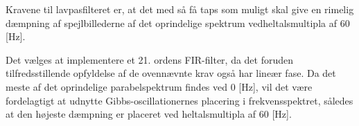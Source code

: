 Kravene til lavpasfilteret er, at det med så få taps
som muligt skal give en rimelig dæmpning af
spejlbillederne af det oprindelige spektrum vedheltalsmultipla af 60 [Hz].

Det vælges at implementere et 21. ordens FIR-filter, da det foruden tilfredsstillende opfyldelse
af de ovennævnte krav også har lineær fase.
Da det meste af det oprindelige parabelspektrum findes ved 0 [Hz], vil det være
fordelagtigt at udnytte Gibbs-oscillationernes placering i frekvensspektret, således
at den højeste dæmpning er placeret ved heltalsmultipla af 60 [Hz].

